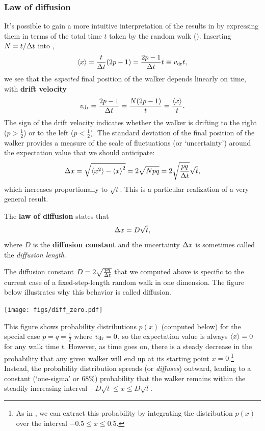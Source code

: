 \subsubsection{Law of diffusion}
It's possible to gain a more intuitive interpretation of the results in  by expressing them in terms of the total time $t$ taken by the random walk ().
Inserting $N = t / \Delta t$ into ,
\begin{equation*}
  \left\langle x \right\rangle = \frac{t}{\Delta t} (2p - 1) = \frac{2p - 1}{\Delta t} t \equiv v_{\mathrm{dr}} t,
\end{equation*}
we see that the \textit{expected} final position of the walker depends linearly on time, with \textbf{drift velocity}
\begin{equation}
  v_{\mathrm{dr}} = \frac{2p - 1}{\Delta t} = \frac{N(2p - 1)}{t} = \frac{\left\langle x \right\rangle}{t}.
\end{equation}
The sign of the drift velocity indicates whether the walker is drifting to the right ($p > \frac{1}{2}$) or to the left ($p < \frac{1}{2}$).
The standard deviation of the final position of the walker provides a measure of the scale of fluctuations (or `uncertainty') around the expectation value that we should anticipate:
\begin{equation*}
  \Delta x = \sqrt{\left\langle x^2 \right\rangle - \left\langle x \right\rangle^2} = 2\sqrt{Npq} = 2\sqrt{\frac{pq}{\Delta t}} \sqrt{t},
\end{equation*}
which increases proportionally to $\sqrt{t}$.
This is a particular realization of a very general result.

\begin{shaded}
  The \textbf{law of diffusion} states that
  \begin{equation}
    \Delta x = D \sqrt{t},
  \end{equation}
  where $D$ is the \textbf{diffusion constant} and the uncertainty $\Delta x$ is sometimes called the \textit{diffusion length}.
\end{shaded}

The diffusion constant $D = 2\sqrt{\frac{pq}{\Delta t}}$ that we computed above is specific to the current case of a fixed-step-length random walk in one dimension.
The figure below illustrates why this behavior is called diffusion.
\begin{center}
  \texttt{[image: figs/diff\_zero.pdf]}
\end{center}
This figure shows probability distributions $p(x)$ (computed below) for the special case $p = q = \frac{1}{2}$ where $v_{\mathrm{dr}} = 0$, so the expectation value is always $\left\langle x \right\rangle = 0$ for any walk time $t$.
However, as time goes on, there is a steady decrease in the probability that any given walker will end up at its starting point $x = 0$.\footnote{As in , we can extract this probability by integrating the distribution $p(x)$ over the interval $-0.5 \leq x \leq 0.5$.}
Instead, the probability distribution spreads (or \textit{diffuses}) outward, leading to a constant (`one-sigma' or 68\%) probability that the walker remains within the steadily increasing interval $-D\sqrt{t} \leq x \leq D\sqrt{t}$.

